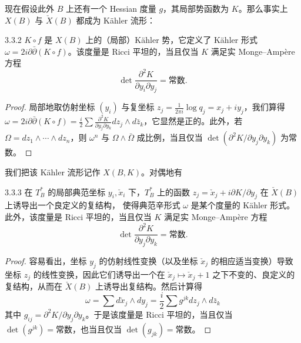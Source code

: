 现在假设此外 $B$ 上还有一个 Hessian 度量 $g$，其局部势函数为 $K$。那么事实上 $X(B)$ 与 $\check X(B)$ 都成为 Kähler 流形：

\begin{proposition}{3.3.2}
$K\circ f$ 是 $X(B)$ 上的（局部）Kähler 势，它定义了 Kähler 形式 $\omega=2i\partial\bar\partial(K\circ f)$。该度量是 Ricci 平坦的，当且仅当 $K$ 满足实 Monge--Ampère 方程
\begin{equation*}
\det\frac{\partial^2K}{\partial y_i\partial y_j}=\text{常数}.
\end{equation*}
\end{proposition}

\begin{proof}
局部地取仿射坐标 $(y_i)$ 与复坐标 $z_j=\frac{1}{2\pi i}\log q_j=x_j+iy_j$，我们算得 $\omega=2i\partial\bar\partial(K\circ f)=\frac{i}{2}\sum\frac{\partial^2K}{\partial y_j\partial y_k}dz_j\wedge d\bar z_k$，它显然是正的。此外，若 $\Omega=dz_1\wedge\cdots\wedge dz_n$，则 $\omega^n$ 与 $\Omega\wedge\bar\Omega$ 成比例，当且仅当 $\det(\partial^2K/\partial y_j\partial y_k)$ 为常数。\proofend
\end{proof}


我们把该 Kähler 流形记作 $X(B,K)$。对偶地有

\begin{proposition}{3.3.3}
在 $T_B^*$ 的局部典范坐标 $y_i,\check x_i$ 下，$T_B^*$ 上的函数 $z_j=\check x_j+i\partial K/\partial y_j$ 在 $\check X(B)$ 上诱导出一个良定义的复结构，
使得典范辛形式 $\omega$ 是某个度量的 Kähler 形式。此外，该度量是 Ricci 平坦的，当且仅当 $K$ 满足实 Monge--Ampère 方程
\begin{equation*}
\det\frac{\partial^2K}{\partial y_j\partial y_k}=\text{常数}.
\end{equation*}
\end{proposition}

\begin{proof}
容易看出，坐标 $y_j$ 的仿射线性变换（以及坐标 $\check x_j$ 的相应适当变换）导致坐标 $z_j$ 的线性变换，因此它们诱导出一个在 $\check x_j\mapsto\check x_j+1$ 之下不变的、良定义的复结构，从而在 $\check X(B)$ 上诱导出复结构。然后计算得
\begin{equation*}
\omega=\sum d\check x_j\wedge dy_j=\frac{i}{2}\sum g^{jk}dz_j\wedge d\bar z_k
\end{equation*}
其中 $g_{ij}=\partial^2K/\partial y_j\partial y_k$。于是该度量是 Ricci 平坦的，当且仅当 $\det(g^{jk})=\text{常数}$，也当且仅当 $\det(g_{jk})=\text{常数}$。\proofend
\end{proof}

